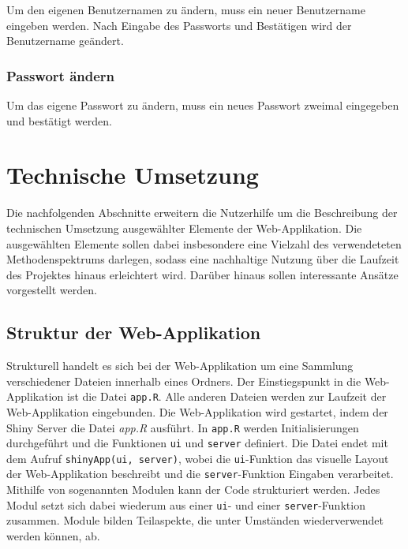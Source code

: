 \documentclass[
]{article}
\begin{document}
Um den eigenen Benutzernamen zu ändern, muss ein neuer Benutzername eingeben werden. Nach Eingabe des Passworts und Bestätigen wird der Benutzername geändert.

\hypertarget{passwort-uxe4ndern}{%
\subsubsection{Passwort ändern}\label{passwort-uxe4ndern}}

Um das eigene Passwort zu ändern, muss ein neues Passwort zweimal eingegeben und bestätigt werden.

\hypertarget{technical-guide}{%
\section{Technische Umsetzung}\label{technical-guide}}

Die nachfolgenden Abschnitte erweitern die Nutzerhilfe um die Beschreibung der technischen Umsetzung ausgewählter Elemente der Web-Applikation. Die ausgewählten Elemente sollen dabei insbesondere eine Vielzahl des verwendeteten Methodenspektrums darlegen, sodass eine nachhaltige Nutzung über die Laufzeit des Projektes hinaus erleichtert wird. Darüber hinaus sollen interessante Ansätze vorgestellt werden.

\hypertarget{struktur-der-web-applikation}{%
\subsection{Struktur der Web-Applikation}\label{struktur-der-web-applikation}}

Strukturell handelt es sich bei der Web-Applikation um eine Sammlung verschiedener Dateien innerhalb eines Ordners. Der Einstiegspunkt in die Web-Applikation ist die Datei \texttt{app.R}. Alle anderen Dateien werden zur Laufzeit der Web-Applikation eingebunden. Die Web-Applikation wird gestartet, indem der Shiny Server die Datei \emph{app.R} ausführt. In \texttt{app.R} werden Initialisierungen durchgeführt und die Funktionen \texttt{ui} und \texttt{server} definiert. Die Datei endet mit dem Aufruf \texttt{shinyApp(ui,\ server)}, wobei die \texttt{ui}-Funktion das visuelle Layout der Web-Applikation beschreibt und die \texttt{server}-Funktion Eingaben verarbeitet. Mithilfe von sogenannten Modulen kann der Code strukturiert werden. Jedes Modul setzt sich dabei wiederum aus einer \texttt{ui}- und einer \texttt{server}-Funktion zusammen. Module bilden Teilaspekte, die unter Umständen wiederverwendet werden können, ab. \autocite{shiny-modules}
\end{document}
